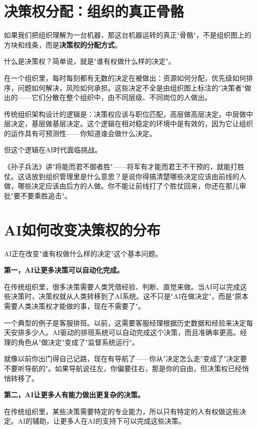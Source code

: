 \section{决策权分配：组织的真正骨骼}


如果我们把组织理解为一台机器，那这台机器运转的真正"骨骼"，不是组织图上的方块和线条，而是\textbf{决策权的分配方式}。

什么是决策权？简单说，就是"谁有权做什么样的决定"。

在一个组织里，每时每刻都有无数的决定在被做出：资源如何分配，优先级如何排序，问题如何解决，风险如何承担。这些决定不全是由组织图上标注的"决策者"做出的——它们分散在整个组织中，由不同层级、不同岗位的人做出。

传统组织架构设计的逻辑是：决策权应该与职位匹配，高层做高层决定，中层做中层决定，基层做基层决定。这个逻辑在相对稳定的环境中是有效的，因为它让组织的运作具有可预测性——你知道谁会做什么决定。

但这个逻辑在AI时代面临挑战。

《孙子兵法》讲"将能而君不御者胜"——将军有才能而君王不干预的，就能打胜仗。这话放到组织管理里是什么意思？是说你得搞清楚哪些决定应该由前线的人做，哪些决定应该由后方的人做。你不能让前线打了个胜仗回来，你还在那儿审批"要不要乘胜追击"。

\section{AI如何改变决策权的分布}


AI正在改变"谁有权做什么样的决定"这个基本问题。

\textbf{第一，AI让更多决策可以自动化完成。}

在传统组织里，很多决策需要人类凭借经验、判断、直觉来做。当AI可以完成这些决策时，决策权就从人类转移到了AI系统。这不只是"AI在做决定"，而是"原本需要人类决策权才能做的事，现在不需要了"。

一个典型的例子是客服排班。以前，这需要客服经理根据历史数据和经验来决定每天安排多少人。AI驱动的排班系统可以自动完成这个决策，而且准确率更高。经理的角色从"做决定"变成了"监督系统运行"。

就像以前你出门得自己记路，现在有导航了——你从"决定怎么走"变成了"决定要不要听导航的"。如果导航说往左，你偏要往右，那是你的自由，但决策权已经悄悄转移了。

\textbf{第二，AI让更多人有能力做出更复杂的决策。}

在传统组织里，某些决策需要特定的专业能力，所以只有特定的人有权做这些决定。AI的辅助，让更多人在AI的支持下可以完成这些决策。

